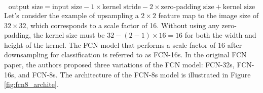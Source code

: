 $$\text{output size} = \text{input size} - 1 \times \text{kernel stride} - 2 \times \text{zero-padding size} + \text{kernel size}$$
Let's consider the example of upsampling a $2 \times 2$ feature map to the image size of $32 \times 32$, which corresponds to a scale factor of 16. Without using any zero-padding, the kernel size must be $32 - (2-1) \times 16 = 16$ for both the width and height of the kernel. The FCN model that performs a scale factor of 16 after downsampling for classification is referred to as FCN-16s. In the original FCN paper, the authors proposed three variations of the FCN model: FCN-32s, FCN-16s, and FCN-8s. The architecture of the FCN-8s model is illustrated in Figure \ref{fig:fcn8_archite}.

